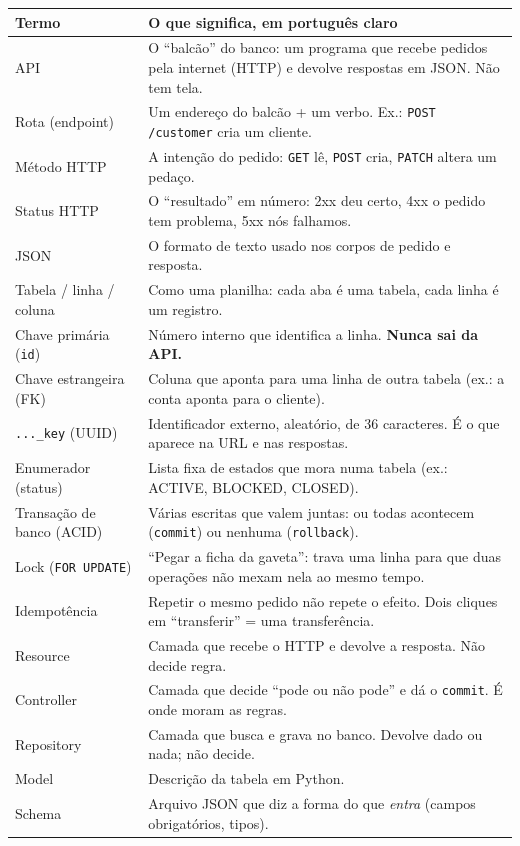 \documentclass[11pt,a4paper]{article}
\newcommand{\tb}[1]{\texttt{#1}}           %
\begin{document}
\begin{longtable}{@{}P{3.6cm}P{12.5cm}@{}}
\toprule
\textbf{Termo} & \textbf{O que significa, em português claro} \\
\midrule
\endhead
API & O ``balcão'' do banco: um programa que recebe pedidos pela internet (HTTP) e devolve respostas em JSON. Não tem tela. \\
Rota (endpoint) & Um endereço do balcão + um verbo. Ex.: \tb{POST /customer} cria um cliente. \\
Método HTTP & A intenção do pedido: \tb{GET} lê, \tb{POST} cria, \tb{PATCH} altera um pedaço. \\
Status HTTP & O ``resultado'' em número: 2xx deu certo, 4xx o pedido tem problema, 5xx nós falhamos. \\
JSON & O formato de texto usado nos corpos de pedido e resposta. \\
Tabela / linha / coluna & Como uma planilha: cada aba é uma tabela, cada linha é um registro. \\
Chave primária (\tb{id}) & Número interno que identifica a linha. \textbf{Nunca sai da API.} \\
Chave estrangeira (FK) & Coluna que aponta para uma linha de outra tabela (ex.: a conta aponta para o cliente). \\
\tb{..._key} (UUID) & Identificador externo, aleatório, de 36 caracteres. É o que aparece na URL e nas respostas. \\
Enumerador (status) & Lista fixa de estados que mora numa tabela (ex.: ACTIVE, BLOCKED, CLOSED). \\
Transação de banco (ACID) & Várias escritas que valem juntas: ou todas acontecem (\tb{commit}) ou nenhuma (\tb{rollback}). \\
Lock (\tb{FOR UPDATE}) & ``Pegar a ficha da gaveta'': trava uma linha para que duas operações não mexam nela ao mesmo tempo. \\
Idempotência & Repetir o mesmo pedido não repete o efeito. Dois cliques em ``transferir'' = uma transferência. \\
Resource & Camada que recebe o HTTP e devolve a resposta. Não decide regra. \\
Controller & Camada que decide ``pode ou não pode'' e dá o \tb{commit}. É onde moram as regras. \\
Repository & Camada que busca e grava no banco. Devolve dado ou nada; não decide. \\
Model & Descrição da tabela em Python. \\
Schema & Arquivo JSON que diz a forma do que \emph{entra} (campos obrigatórios, tipos). \\

\end{longtable}
\end{document}
